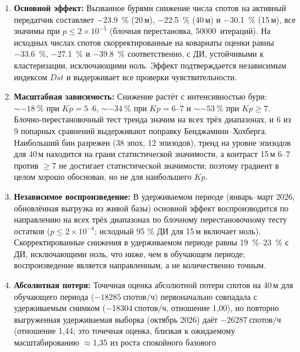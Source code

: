 \documentclass{agujournal2019}
\begin{document}
{\sloppy
\begin{enumerate}
	\item \textbf{Основной эффект:} Вызванное бурями снижение числа спотов на активный передатчик
	      составляет \SI{-23,9}{\percent} (20\,м), \SI{-22,5}{\percent} (40\,м) и
	      \SI{-30,1}{\percent} (15\,м), все значимы при
	      $p \le 2 \times 10^{-5}$ (блочная перестановка,
	      \SI{50000}{\mbox{итераций}}). На исходных числах спотов скорректированные на
	      ковариаты оценки равны \SI{-33.6}{\percent}, \SI{-27.1}{\percent} и
	      \SI{-39.8}{\percent} соответственно, с ДИ, устойчивыми к кластеризации,
	      исключающими ноль. Эффект подтверждается независимым индексом
	      $Dst$ и выдерживает все проверки чувствительности.
	\item \textbf{Масштабная зависимость:} Снижение растёт с интенсивностью
	      бури: $\sim\SI{-18}{\percent}$ при $Kp = 5\text{--}6$,
	      $\sim\SI{-34}{\percent}$ при $Kp = 6\text{--}7$ и
	      $\sim\SI{-53}{\percent}$ при $Kp \ge 7$. Блочно-перестановочный
	      тест тренда значим на всех трёх диапазонах, и 6 из 9 попарных
	      сравнений выдерживают поправку Бенджамини--Хохберга. Наибольший
	      бин разрежен (38 эпох, 12 эпизодов), тренд на уровне эпизодов для 40\,м находится на грани статистической значимости, а контраст 15\,м $6\text{--}7$ против
	      $\ge 7$ не достигает статистической значимости; поэтому градиент в целом хорошо обоснован,
	      но не для наибольшего $Kp$.
	\item \textbf{Независимое воспроизведение:} В удерживаемом периоде
	      (январь--март 2026, обновлённая выгрузка из живой базы) основной
	      эффект воспроизводится по направлению на всех трёх диапазонах
	      по блочному перестановочному тесту остатков
	      ($p \le 2 \times 10^{-4}$; исходный 95 \% ДИ для 15\,м включает
	      ноль). Скорректированные снижения в удерживаемом периоде равны
	      \SIrange{19}{23}{\percent} с ДИ, исключающими ноль, что ниже, чем в обучающем периоде; воспроизведение является направленным,
	      а не количественно точным.
	\item \textbf{Абсолютная потеря:} Точечная оценка
	      абсолютной потери спотов на 40\,м для обучающего периода ($\SI{-18285}{\mbox{спотов/ч}}$)
	      первоначально совпадала с удерживаемым снимком
	      ($\SI{-18304}{\mbox{спотов/ч}}$, отношение 1,00), но повторно выгруженная
	      удерживаемая выборка (октябрь 2026) даёт $\SI{-26287}{\mbox{спотов/ч}}$
	      (отношение 1,44; это точечная оценка, близкая к ожидаемому масштабированию $\approx$1,35 из роста спокойного базового

\end{enumerate}}
\end{document}
